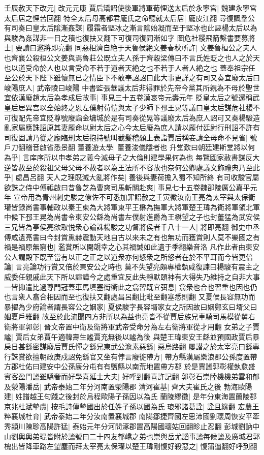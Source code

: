 壬辰赦天下改元|{
	改元元康}
賈后矯詔使後軍將軍荀悝送太后於永寧宫|{
	魏建永寧宫太后居之悝苦回翻}
特全太后母高都君龐氏之命聽就太后居|{
	龐皮江翻}
尋復諷羣公有司奏曰皇太后隂漸姦謀|{
	履霜者堅冰之漸言隂始凝而至于堅冰也此誣楊太后以為與駿為姦謀非一日之積也復扶又翻下可復司復同漸如字}
圖危社稷飛箭繫書要募將士|{
	要讀曰邀將即亮翻}
同惡相濟自絶于天魯侯絶文姜春秋所許|{
	文姜魯桓公之夫人也齊襄公殺桓公文姜與焉魯莊公既立夫人孫于齊穀梁傳曰不言氏姓貶之也人之於天也以道受命於人也以言受命不若于道者天絶之也不若于人者人絶之也}
蓋奉祖宗任至公於天下陛下雖懷無已之情臣下不敢奉詔詔曰此大事更詳之有司又奏宜廢太后曰峻陽庶人|{
	武帝陵曰峻陽}
中書監張華議太后非得罪於先帝今黨其所親為不母於聖世宜依漢廢趙太后為孝成后故事|{
	事見三十五卷漢哀帝元壽元年}
貶皇太后之號還稱武皇后居異宫以全始終之恩左僕射荀愷與太子少師下邳王晃等議曰皇太后謀危社稷不可復配先帝宜貶尊號廢詣金墉城於是有司奏從晃等議廢太后為庶人詔可又奏楊駿造亂家屬應誅詔原其妻龎命以尉太后之心今太后廢為庶人請以龎付廷尉行刑詔不許有司復固請乃從之龐臨刑太后抱持號叫截髪稽顙上表詣賈后稱妾請全母命不見省|{
	號戶刀翻稽音啟省悉景翻}
董養遊太學|{
	董養浚儀隱者也}
升堂歎曰朝廷建斯堂將以何為乎|{
	言庠序所以申孝弟之義今滅母子之大倫則建學果何為也}
每覽國家赦書謀反大逆皆赦至於殺祖父母父母不赦者以為王法所不容故也奈何公卿處議文飾禮典乃至此乎|{
	處昌呂翻}
天人之理既滅大亂將作矣|{
	養後與妻荷擔入蜀不知所終}
有司收駿官屬欲誅之侍中傅祗啟曰昔魯芝為曹爽司馬斬關赴爽|{
	事見七十五卷魏邵陵厲公嘉平元年}
宣帝用為青州刺史駿之僚佐不可悉加罪詔赦之壬寅徵汝南王亮為太宰與太保衛瓘皆録尚書事輔政以秦王柬為大將軍東平王楙為撫軍大將軍楚王瑋為衛將軍領北軍中候下邳王晃為尚書令東安公繇為尚書左僕射進爵為王楙望之子也封董猛為武安侯三兄皆為亭侯亮欲取悦衆心論誅楊駿之功督將侯者千八十一人|{
	將即亮翻}
御史中丞傅咸遺亮書曰今封賞熏赫震動天地自古以來未之有也無功而獲賞則人莫不樂國之有禍是禍原無窮也|{
	濫賞所以開覬幸之心其禍誠如此遺于季翻樂音洛}
凡作此者由東安公人謂殿下既至當有以正之正之以道衆亦何怒衆之所怒者在於不平耳而今皆更倍論|{
	言亮論功行賞又倍於東安公之時也}
莫不失望亮頗專權埶咸復諫曰楊駿有震主之威委任親戚此天下所以諠譁今之處重宜反此失靜默頤神有大得失乃維持之自非大事一皆抑遣比過尊門冠蓋車馬填塞街衢此之翕習既宜弭息|{
	翕衆也合也習重也因也仍也言衆人翕合相因而至也復扶又翻處昌呂翻比毗至翻塞悉則翻}
又夏侯長容無功而暴擢為少府論者謂長容公之姻家|{
	夏侯駿字長容壻家女之所因故曰姻鄭玄曰壻父曰姻夏戶雅翻}
故至於此流聞四方非所以為益也亮皆不從賈后族兄車騎司馬模從舅右衛將軍郭彰|{
	晉文帝置中衛及衛將軍武帝受命分為左右衛將軍從才用翻}
女弟之子賈謐|{
	賈后女弟賈午適韓壽生謐賈充無後以謐為後}
與楚王瑋東安王繇並預國政賈后暴戾日甚繇密謀廢后賈氏憚之繇兄東武公澹素惡繇|{
	惡烏路翻}
屢譛之於太宰亮曰繇專行誅賞欲擅朝政庚戍詔免繇官又坐有悖言廢徙帶方|{
	帶方縣漢屬樂浪郡公孫度置帶方郡杜佑曰建安中公孫康分屯有有鹽縣以南荒地置帶方郡}
於是賈謐郭彰權埶愈盛賓客盈門謐雖驕奢而好學喜延士大夫|{
	好呼到翻喜許記翻}
郭彰石崇陸機機弟雲和郁及滎陽潘岳|{
	武帝泰始二年分河南置滎陽郡}
清河崔基|{
	齊大夫崔氏之後}
勃海歐陽建|{
	姓譜越王句踐之後封於烏程歐陽子孫因以為氏}
蘭陵繆徵|{
	是年分東海置蘭陵郡}
京兆杜斌摰虞|{
	按毛詩傳摯國出於任姓子孫以國為氏}
琅邪諸葛詮|{
	詮且緣翻}
宏農王粹襄城杜育|{
	武帝泰始二年分汝南置襄城郡}
南陽鄒捷齊國左思沛國劉瓌周恢安平牽秀潁川陳聄高陽許猛|{
	泰始元年分河問涿郡置高陽國瓌姑回翻眕止忍翻}
彭城劉訥中山劉輿輿弟琨皆附於謐號曰二十四友郁嶠之弟也崇與岳尤謟事謐每候謐及廣城君郭槐出皆降車路左望塵而拜太宰亮太保瓘以楚王瑋剛愎好殺惡之|{
	愎蒲逼翻好呼到翻}


